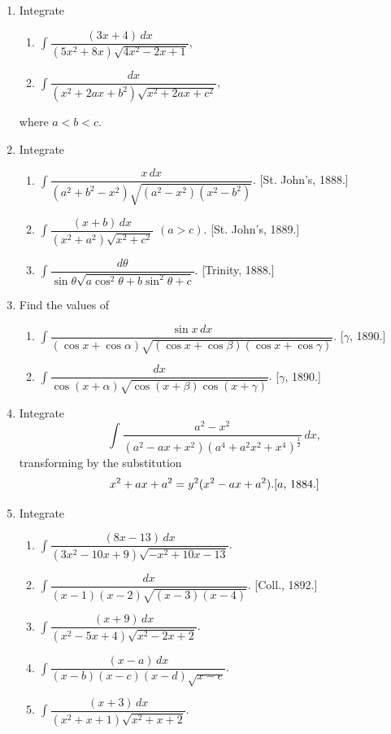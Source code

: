 \documentclass[11pt, a4paper]{article}
\newcommand{\source}[1]{\hfill\textnormal{[#1]}}
\begin{document}
\begin{enumerate}[leftmargin=2em]
\item Integrate
\begin{enumerate}[label=(\roman*)]
\item $\displaystyle\int \dfrac{(3x+4)\,dx}{(5x^2+8x)\sqrt{4x^2-2x+1}}$,
\item $\displaystyle\int \dfrac{dx}{(x^2+2ax+b^2)\sqrt{x^2+2ax+c^2}}$,
\end{enumerate}
where $a<b<c$.

\item Integrate
\begin{enumerate}[label=(\roman*)]
\item $\displaystyle\int \dfrac{x\,dx}{(a^2+b^2-x^2)\sqrt{(a^2-x^2)(x^2-b^2)}}$. \source{St. John's, 1888.}
\item $\displaystyle\int \dfrac{(x+b)\,dx}{(x^2+a^2)\sqrt{x^2+c^2}}$ \quad $(a>c)$. \source{St. John's, 1889.}
\item $\displaystyle\int \dfrac{d\theta}{\sin\theta\sqrt{a\cos^2\theta+b\sin^2\theta+c}}$. \source{Trinity, 1888.}
\end{enumerate}

\item Find the values of
\begin{enumerate}[label=(\roman*)]
\item $\displaystyle\int \dfrac{\sin x\,dx}{(\cos x+\cos\alpha)\sqrt{(\cos x+\cos\beta)(\cos x+\cos\gamma)}}$. \source{$\gamma$, 1890.}
\item $\displaystyle\int \dfrac{dx}{\cos(x+\alpha)\sqrt{\cos(x+\beta)\cos(x+\gamma)}}$. \source{$\gamma$, 1890.}
\end{enumerate}

\item Integrate
\[
\int \dfrac{a^2-x^2}{(a^2-ax+x^2)(a^4+a^2x^2+x^4)^{\frac12}}\,dx,
\]
transforming by the substitution
\[
x^2+ax+a^2=y^2(x^2-ax+a^2). \source{$a$, 1884.}
\]

\item Integrate
\begin{enumerate}[label=(\roman*)]
\item $\displaystyle\int \dfrac{(8x-13)\,dx}{(3x^2-10x+9)\sqrt{-x^2+10x-13}}$.
\item $\displaystyle\int \dfrac{dx}{(x-1)(x-2)\sqrt{(x-3)(x-4)}}$. \source{Coll., 1892.}
\item $\displaystyle\int \dfrac{(x+9)\,dx}{(x^2-5x+4)\sqrt{x^2-2x+2}}$.
\item $\displaystyle\int \dfrac{(x-a)\,dx}{(x-b)(x-c)(x-d)\sqrt{x-e}}$.
\item $\displaystyle\int \dfrac{(x+3)\,dx}{(x^2+x+1)\sqrt{x^2+x+2}}$.
\end{enumerate}


\end{enumerate}
\end{document}
